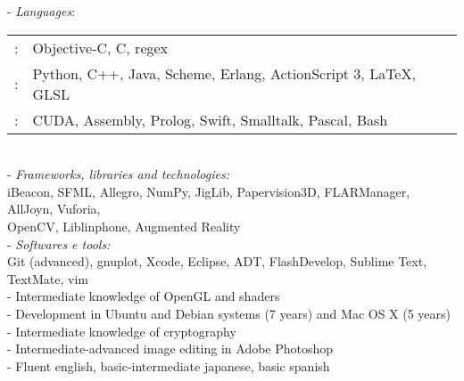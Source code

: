 \documentclass[]{res} %
\def \divspace{6pt}
\begin{document}
\begin{resume}
- {\sl Languages}: \\
\setlength\tabcolsep{2pt}
\begin{tabular}{l l}
\hspace*{1.5em}{\it Fluent}:& Objective-C, C, regex \\
\hspace*{1.5em}{\it More Familiar}:& Python, C++, Java, Scheme, Erlang, ActionScript 3, \LaTeX, GLSL \\
\hspace*{1.5em}{\it Less Familiar}:& CUDA, Assembly, Prolog, Swift, Smalltalk, Pascal, Bash \\
\end{tabular}
\\
- {\sl Frameworks, libraries and technologies:} \\
\hspace*{1.5em}iBeacon, SFML, Allegro, NumPy, JigLib, Papervision3D, FLARManager, AllJoyn, Vuforia, \\
\hspace*{1.5em}OpenCV, Liblinphone, Augmented Reality
\\
- {\sl Softwares e tools:} \\
\hspace*{1.5em}Git (advanced), gnuplot, Xcode, Eclipse, ADT, FlashDevelop, Sublime Text, TextMate, vim
\\
- Intermediate knowledge of OpenGL and shaders \\
- Development in Ubuntu and Debian systems (7 years) and Mac OS X (5 years) \\
- Intermediate knowledge of cryptography \\
- Intermediate-advanced image editing in Adobe Photoshop \\
- Fluent english, basic-intermediate japanese, basic spanish\\\\



\end{resume}
\end{document}
